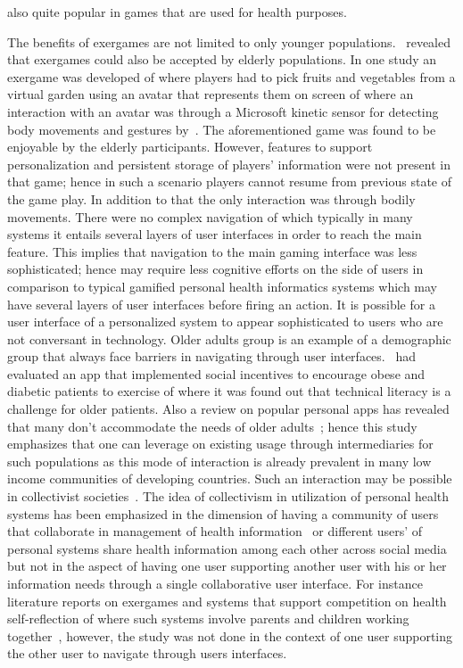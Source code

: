 also quite popular in games that are used for health purposes. 

The benefits of exergames are not limited to only younger populations.~\cite{brox2011exergames} revealed that exergames could also be accepted by elderly populations. In one study an exergame was developed of where players had to pick fruits and vegetables from a virtual garden using an avatar that represents them on screen of where an interaction with an avatar was through a Microsoft kinetic sensor for detecting body movements and gestures by~\citep{brauner2013increase}. The aforementioned game was found to be enjoyable by the elderly participants. However, features to support personalization and persistent storage of players' information were not present in that game; hence in such a scenario players cannot resume from previous state of the game play. In addition to that the only interaction was through bodily movements. There were no complex navigation of which typically in many systems it entails several layers of user interfaces in order to reach the main feature. This implies that navigation to the main gaming interface was less sophisticated; hence may require less cognitive efforts on the side of users in comparison to typical gamified personal health informatics systems which may have several layers of user interfaces before firing an action. It is possible for a user interface of a personalized system to appear sophisticated to users who are not conversant in technology. Older adults group is an example of a demographic group that always face barriers in navigating through user interfaces.~\cite{chen2016social} had evaluated an app that implemented social incentives to encourage obese and diabetic patients to exercise of where it was found out that technical literacy is a challenge for older patients. Also a review on popular personal apps has revealed that many don't accommodate the needs of older adults~\citep{silva2014:smartphones}; hence this study emphasizes that one can leverage on existing usage through intermediaries for such populations as this mode of interaction is already prevalent in many low income communities of developing countries. Such an interaction may be possible in collectivist societies~\citep{parikh2006}. The idea of collectivism in utilization of personal health systems has been emphasized in the dimension of having a community of users that collaborate in management of health information~\citep{colineau2011motivating,grimes2009toward}  or different users' of personal systems share health information among each other across social media~\citep{ploderer2014social} but not in the aspect of having one user supporting another user with his or her information needs through a single collaborative user interface. For instance literature reports on exergames and systems that support competition on health self-reflection of where such systems involve  parents and children working together~\citep{grimes2009toward,saksono2015spaceship}, however, the study was not done in the context of one user supporting the other user to navigate through users interfaces.

